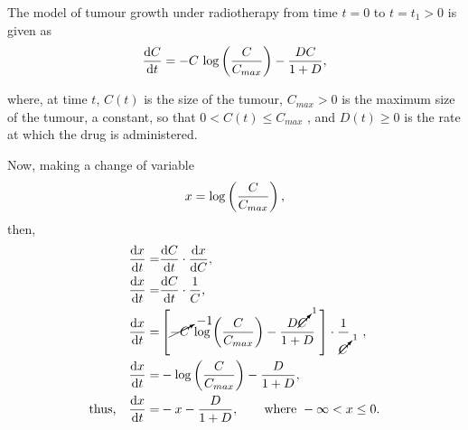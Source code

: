 \def\Cmax{C_{max}}%
The model of tumour growth under radiotherapy from time $t=0$ to $t=t_1>0$ is given as
\begin{equation}
	\label{eq:6.1}
	\deriv{C}{t} = -C\,\log\lr{\frac{C}{\Cmax}} - \frac{DC}{1+D},
\end{equation}

where, at time $t$, $C(t)$ is the size of the tumour, $\Cmax > 0$ is the maximum
size of the tumour, a constant, so that $0 < C(t) \leq \Cmax$ , and $D(t) \geq 0$ is the
rate at which the drug is administered.

Now, making a change of variable
\[
	x = \log\lr{\frac{C}{\Cmax}},
\]
then,
\begin{align*}
	\deriv{x}{t} =& \deriv{C}{t}\cdot\deriv{x}{C},\\
	\deriv{x}{t} =& \deriv{C}{t}\cdot \frac{1}{C},\\
	\deriv{x}{t} =& \lrs{\cancelto{-1}{-C}\,\log\lr{\frac{C}{\Cmax}} - \frac{D\cancelto{1}{C}}{1+D}\,\,} \cdot\frac{1}{\cancelto{1}{C}}\quad,\\
	\deriv{x}{t} =& -\log\lr{\frac{C}{\Cmax}} - \frac{D}{1+D},\\
	\textrm{thus,}\quad\deriv{x}{t} =& -x -\frac{D}{1+D}, \qquad\textrm{where } -\infty < x \leq 0.
\end{align*}